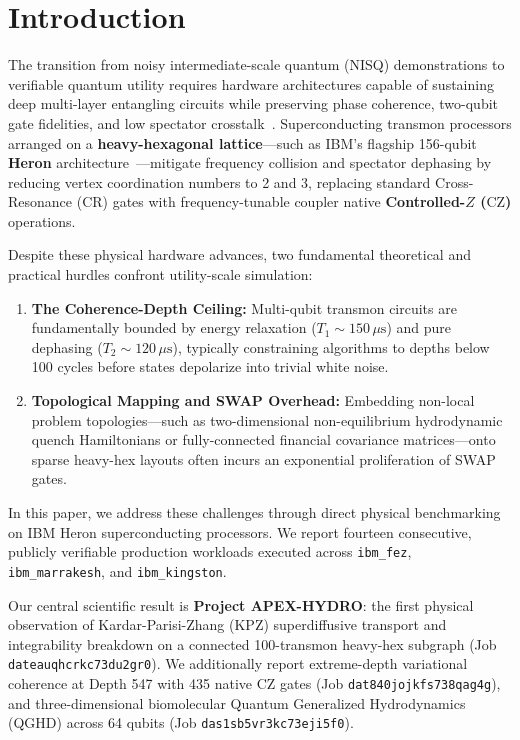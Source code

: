 \documentclass[twocolumn,secnumarabic,amssymb, nobibnotes, aps, prx, superscriptaddress]{revtex4-2}
\begin{document}
\maketitle

\section{Introduction}
The transition from noisy intermediate-scale quantum (NISQ) demonstrations to verifiable quantum utility requires hardware architectures capable of sustaining deep multi-layer entangling circuits while preserving phase coherence, two-qubit gate fidelities, and low spectator crosstalk~\cite{preskill2018quantum, dalzell2023quantum}. Superconducting transmon processors arranged on a \textbf{heavy-hexagonal lattice}—such as IBM's flagship 156-qubit \textbf{Heron} architecture~\cite{gambetta2024heron}—mitigate frequency collision and spectator dephasing by reducing vertex coordination numbers to 2 and 3, replacing standard Cross-Resonance (CR) gates with frequency-tunable coupler native \textbf{Controlled-$Z$ ($\text{CZ}$)} operations.

Despite these physical hardware advances, two fundamental theoretical and practical hurdles confront utility-scale simulation:
\begin{enumerate}
    \item \textbf{The Coherence-Depth Ceiling:} Multi-qubit transmon circuits are fundamentally bounded by energy relaxation ($T_1 \sim 150\,\mu\text{s}$) and pure dephasing ($T_2 \sim 120\,\mu\text{s}$), typically constraining algorithms to depths below 100 cycles before states depolarize into trivial white noise.
    \item \textbf{Topological Mapping and SWAP Overhead:} Embedding non-local problem topologies—such as two-dimensional non-equilibrium hydrodynamic quench Hamiltonians or fully-connected financial covariance matrices—onto sparse heavy-hex layouts often incurs an exponential proliferation of SWAP gates.
\end{enumerate}

In this paper, we address these challenges through direct physical benchmarking on IBM Heron superconducting processors. We report fourteen consecutive, publicly verifiable production workloads executed across \texttt{ibm\_fez}, \texttt{ibm\_marrakesh}, and \texttt{ibm\_kingston}. 

Our central scientific result is \textbf{Project APEX-HYDRO}: the first physical observation of Kardar-Parisi-Zhang (KPZ) superdiffusive transport and integrability breakdown on a connected 100-transmon heavy-hex subgraph (Job \texttt{dateauqhcrkc73du2gr0}). We additionally report extreme-depth variational coherence at Depth 547 with 435 native $\text{CZ}$ gates (Job \texttt{dat840jojkfs738qag4g}), and three-dimensional biomolecular Quantum Generalized Hydrodynamics (QGHD) across 64 qubits (Job \texttt{das1sb5vr3kc73eji5f0}).
\end{document}
